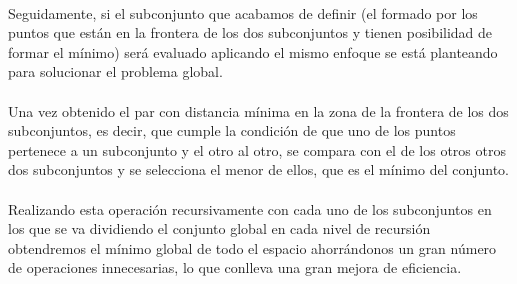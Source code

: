 \documentclass{article}
\begin{document}
			\paragraph{}
			Seguidamente, si el subconjunto que acabamos de  definir (el formado por los puntos que están en la frontera de los dos subconjuntos y tienen posibilidad de formar el mínimo) será evaluado aplicando el mismo enfoque se está planteando para solucionar el problema global.

			\paragraph{}
			Una vez obtenido el par con distancia mínima en la zona de la frontera de los dos subconjuntos, es decir, que cumple la condición de que uno de los puntos pertenece a un subconjunto y el otro al otro, se compara con el de los otros otros dos subconjuntos y se selecciona el menor de ellos, que es el mínimo del conjunto.

	\paragraph{}
	Realizando esta operación recursivamente con cada uno de los subconjuntos en los que se va dividiendo el conjunto global en cada nivel de recursión obtendremos el mínimo global de todo el espacio ahorrándonos un gran número de operaciones innecesarias, lo que conlleva una gran mejora de eficiencia.	
\end{document}
